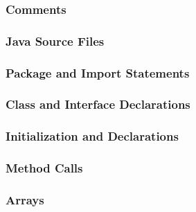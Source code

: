 \subsubsection{Comments}
\begin{itemize}
\end{itemize}

\subsubsection{Java Source Files}
\begin{itemize}
\end{itemize}

\subsubsection{Package and Import Statements}
\begin{itemize}
\end{itemize}

\subsubsection{Class and Interface Declarations}
\begin{itemize}
\end{itemize}

\subsubsection{Initialization and Declarations}
\begin{itemize}
\end{itemize}

\subsubsection{Method Calls}
\begin{itemize}
\end{itemize}

\subsubsection{Arrays}
\begin{itemize}
\end{itemize}

